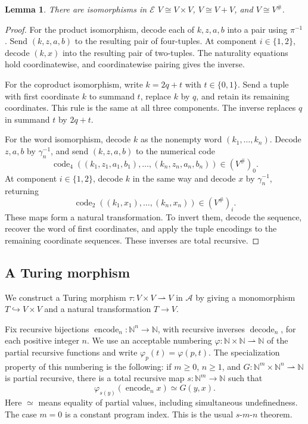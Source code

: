 \documentclass[11pt]{article}
\newtheorem{lemma}[theorem]{Lemma}
\newcommand{\N}{\mathbb N}
\begin{document}
\begin{lemma}\label{lem:fork-frames}
There are isomorphisms in $\mathcal E$
$V\cong V\times V$, $V\cong V+V$, and $V\cong V^\#$.
\end{lemma}
\begin{proof}
For the product isomorphism, decode each of $k,z,a,b$ into a
pair using $\pi^{-1}$. Send $(k,z,a,b)$ to the resulting pair
of four-tuples. At component $i\in\{1,2\}$, decode $(k,x)$ into
the resulting pair of two-tuples. The naturality equations hold
coordinatewise, and coordinatewise pairing gives the inverse.

For the coproduct isomorphism, write $k=2q+t$ with
$t\in\{0,1\}$. Send a tuple with first coordinate $k$ to
summand $t$, replace $k$ by $q$, and retain its remaining
coordinates. This rule is the same at all three components.
The inverse replaces $q$ in summand $t$ by $2q+t$.

For the word isomorphism, decode $k$ as the nonempty word
$(k_1,\ldots,k_n)$. Decode $z,a,b$ by $\gamma_n^{-1}$,
and send $(k,z,a,b)$ to the numerical code
\[
 \operatorname{code}_4
 ((k_1,z_1,a_1,b_1),\ldots,(k_n,z_n,a_n,b_n))
 \in(V^\#)_0.
\]
At component $i\in\{1,2\}$, decode $k$ in the same way and
decode $x$ by $\gamma_n^{-1}$, returning
\[
 \operatorname{code}_2((k_1,x_1),\ldots,(k_n,x_n))\in(V^\#)_i.
\]
These maps form a natural transformation. To invert them, decode
the sequence, recover the word of first coordinates, and apply
the tuple encodings to the remaining coordinate sequences.
These inverses are total recursive.
\end{proof}

\subsection{A Turing morphism}\label{app:fork-turing}

We construct a Turing morphism $\tau:V\times V\rightharpoonup V$
in $\mathcal A$ by giving a monomorphism $T\hookrightarrow V\times V$
and a natural transformation $T\to V$.

Fix recursive bijections
$\operatorname{encode}_n:\N^n\to\N$, with recursive inverses
$\operatorname{decode}_n$, for each positive integer $n$.
We use an acceptable numbering
$\varphi:\N\times\N\rightharpoonup\N$ of the partial recursive
functions and write $\varphi_p(t)=\varphi(p,t)$.
The specialization property of this numbering is the following:
if $m\geq0$, $n\geq1$, and
$G:\N^m\times\N^n\rightharpoonup\N$ is partial recursive,
there is a total recursive map $s:\N^m\to\N$ such that
\[
 \varphi_{s(y)}(\operatorname{encode}_n x)\simeq G(y,x).
\]
Here $\simeq$ means equality of partial values,
including simultaneous undefinedness. The case $m=0$ is a
constant program index. This is the usual $s$-$m$-$n$ theorem.
\end{document}
